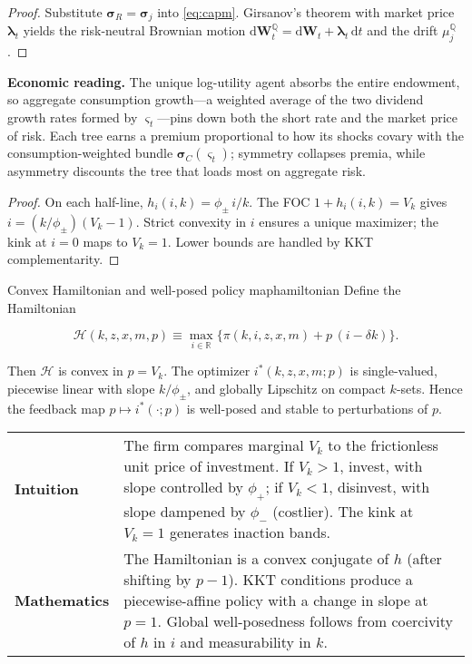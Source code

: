 ﻿\documentclass[11pt,letterpaper,oneside]{article}
\numberwithin{equation}{section}
\newcommand{\R}{\mathbb{R}}
\newcommand{\1}{\mathbf{1}}
\newcommand{\diff}{\mathrm{d}}
\begin{document}
\begin{proof}
Substitute $\bm{\sigma}_R=\bm{\sigma}_j$ into \eqref{eq:capm}. Girsanov's theorem with market price $\bm{\lambda}_t$ yields the risk-neutral Brownian motion $\diff \bm{W}^{\mathbb{Q}}_t = \diff \bm{W}_t + \bm{\lambda}_t\,\diff t$ and the drift $\mu_j^{\mathbb{Q}}$.
\end{proof}
\begin{tcolorbox}[didacticstyle]
\textbf{Economic reading.} The unique log-utility agent absorbs the entire endowment, so aggregate consumption growth---a weighted average of the two dividend growth rates formed by $\varsigma_t$---pins down both the short rate and the market price of risk. Each tree earns a premium proportional to how its shocks covary with the consumption-weighted bundle $\bm{\sigma}_C(\varsigma_t)$; symmetry collapses premia, while asymmetry discounts the tree that loads most on aggregate risk.
\end{tcolorbox}

\begin{proof}
On each half-line, $h_i(i,k)=\phi_\pm\,i/k$. The FOC $1+h_i(i,k)=V_k$ gives $i=(k/\phi_\pm)(V_k-1)$. Strict convexity in $i$ ensures a unique maximizer; the kink at $i=0$ maps to $V_k=1$. Lower bounds are handled by KKT complementarity.
\end{proof}

\begin{proposition}{Convex Hamiltonian and well-posed policy map}{hamiltonian}
Define the Hamiltonian

$$
\mathcal{H}(k,z,x,m,p)\equiv \max_{i\in\R}\{\pi(k,i,z,x,m)+p\,(i-\delta k)\}.
$$

Then $\mathcal{H}$ is convex in $p=V_k$. The optimizer $i^*(k,z,x,m;p)$ is single-valued, piecewise linear with slope $k/\phi_\pm$, and globally Lipschitz on compact $k$-sets. Hence the feedback map $p\mapsto i^*(\cdot;p)$ is well-posed and stable to perturbations of $p$.
\end{proposition}

\begin{tcolorbox}[didacticstyle]
\sloppy
\begin{tabularx}{\textwidth}{@{}p{}X@{}}
\textbf{Intuition} & The firm compares marginal $V_k$ to the frictionless unit price of investment. If $V_k>1$, invest, with slope controlled by $\phi_+$; if $V_k<1$, disinvest, with slope dampened by $\phi_-$ (costlier). The kink at $V_k=1$ generates inaction bands.\\
\textbf{Mathematics} & The Hamiltonian is a convex conjugate of $h$ (after shifting by $p-1$). KKT conditions produce a piecewise-affine policy with a change in slope at $p=1$. Global well-posedness follows from coercivity of $h$ in $i$ and measurability in $k$.
\end{tabularx}
\end{tcolorbox}
\end{document}
